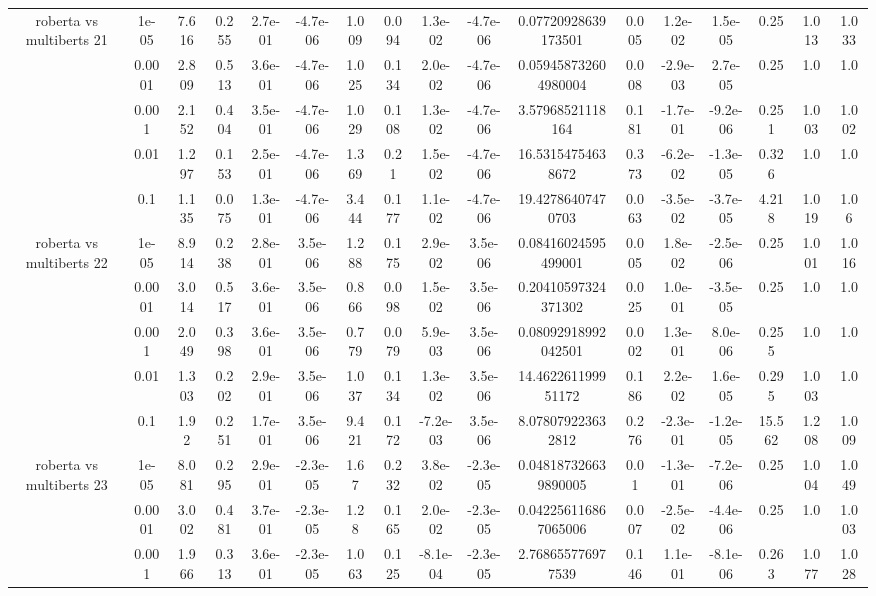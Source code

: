 \begin{tabular}{|c|c|c|c|c|c|c|c|c|c|c|c|c|c|c|c|c|}
\hline
\multirow{5}{*}{roberta  vs multiberts 21} & 1e-05 & 7.616 & 0.255 & 2.7e-01 & -4.7e-06 & 1.009 & 0.094 & 1.3e-02 & -4.7e-06 & 0.07720928639173501 & 0.005 & 1.2e-02 & 1.5e-05 & 0.25 & 1.013 & 1.033 \\
 & 0.0001 & 2.809 & 0.513 & 3.6e-01 & -4.7e-06 & 1.025 & 0.134 & 2.0e-02 & -4.7e-06 & 0.059458732604980004 & 0.008 & -2.9e-03 & 2.7e-05 & 0.25 & 1.0 & 1.0 \\
 & 0.001 & 2.152 & 0.404 & 3.5e-01 & -4.7e-06 & 1.029 & 0.108 & 1.3e-02 & -4.7e-06 & 3.57968521118164 & 0.181 & -1.7e-01 & -9.2e-06 & 0.251 & 1.003 & 1.002 \\
 & 0.01 & 1.297 & 0.153 & 2.5e-01 & -4.7e-06 & 1.369 & 0.21 & 1.5e-02 & -4.7e-06 & 16.53154754638672 & 0.373 & -6.2e-02 & -1.3e-05 & 0.326 & 1.0 & 1.0 \\
 & 0.1 & 1.135 & 0.075 & 1.3e-01 & -4.7e-06 & 3.444 & 0.177 & 1.1e-02 & -4.7e-06 & 19.42786407470703 & 0.063 & -3.5e-02 & -3.7e-05 & 4.218 & 1.019 & 1.06 \\
\hline
\multirow{5}{*}{roberta  vs multiberts 22} & 1e-05 & 8.914 & 0.238 & 2.8e-01 & 3.5e-06 & 1.288 & 0.175 & 2.9e-02 & 3.5e-06 & 0.08416024595499001 & 0.005 & 1.8e-02 & -2.5e-06 & 0.25 & 1.001 & 1.016 \\
 & 0.0001 & 3.014 & 0.517 & 3.6e-01 & 3.5e-06 & 0.866 & 0.098 & 1.5e-02 & 3.5e-06 & 0.20410597324371302 & 0.025 & 1.0e-01 & -3.5e-05 & 0.25 & 1.0 & 1.0 \\
 & 0.001 & 2.049 & 0.398 & 3.6e-01 & 3.5e-06 & 0.779 & 0.079 & 5.9e-03 & 3.5e-06 & 0.08092918992042501 & 0.002 & 1.3e-01 & 8.0e-06 & 0.255 & 1.0 & 1.0 \\
 & 0.01 & 1.303 & 0.202 & 2.9e-01 & 3.5e-06 & 1.037 & 0.134 & 1.3e-02 & 3.5e-06 & 14.462261199951172 & 0.186 & 2.2e-02 & 1.6e-05 & 0.295 & 1.003 & 1.0 \\
 & 0.1 & 1.92 & 0.251 & 1.7e-01 & 3.5e-06 & 9.421 & 0.172 & -7.2e-03 & 3.5e-06 & 8.078079223632812 & 0.276 & -2.3e-01 & -1.2e-05 & 15.562 & 1.208 & 1.009 \\
\hline
\multirow{5}{*}{roberta  vs multiberts 23} & 1e-05 & 8.081 & 0.295 & 2.9e-01 & -2.3e-05 & 1.67 & 0.232 & 3.8e-02 & -2.3e-05 & 0.048187326639890005 & 0.01 & -1.3e-01 & -7.2e-06 & 0.25 & 1.004 & 1.049 \\
 & 0.0001 & 3.002 & 0.481 & 3.7e-01 & -2.3e-05 & 1.28 & 0.165 & 2.0e-02 & -2.3e-05 & 0.042256116867065006 & 0.007 & -2.5e-02 & -4.4e-06 & 0.25 & 1.0 & 1.003 \\
 & 0.001 & 1.966 & 0.313 & 3.6e-01 & -2.3e-05 & 1.063 & 0.125 & -8.1e-04 & -2.3e-05 & 2.768655776977539 & 0.146 & 1.1e-01 & -8.1e-06 & 0.263 & 1.077 & 1.028 \\

\end{tabular}
